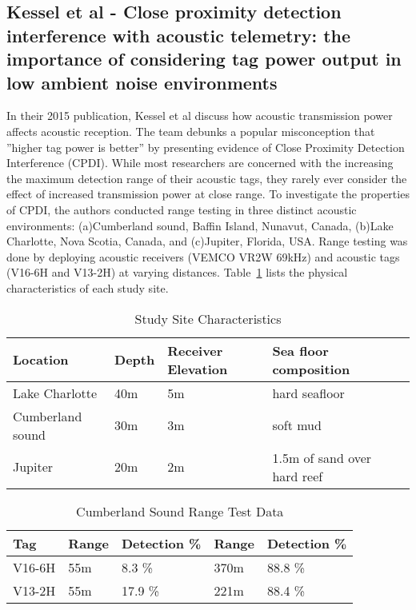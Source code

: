 \subsection{Kessel et al - Close proximity detection interference with acoustic telemetry: the importance of considering tag power output in low ambient noise environments}
In their 2015 publication, Kessel et al\cite{Kessel2015} discuss how acoustic transmission power affects acoustic reception.  The team debunks a popular misconception that ''higher tag power is better'' by presenting evidence of Close Proximity Detection Interference (CPDI).  While most researchers are concerned with the increasing the maximum detection range of their acoustic tags, they rarely ever consider the effect of increased transmission power at close range.  To investigate the properties of CPDI, the authors conducted range testing in three distinct acoustic environments: (a)Cumberland sound, Baffin Island, Nunavut, Canada, (b)Lake Charlotte, Nova Scotia, Canada, and (c)Jupiter, Florida, USA.  Range testing was done by deploying acoustic receivers (VEMCO VR2W 69kHz) and acoustic tags (V16-6H and V13-2H) at varying distances.  Table~\ref{CPDItable} lists the physical characteristics of each study site.

\begin{table}[ht]
	\begin{tabular}{l l l l l}
		Location&Depth&Receiver Elevation&Sea floor composition\\
		\hline
		Lake Charlotte			& 40m	& 5m	& hard seafloor \\
		Cumberland sound		& 30m	& 3m	& soft mud	\\
		Jupiter		& 20m	& 2m	& 1.5m of sand over hard reef\\
	\end{tabular}
	\caption{Study Site Characteristics
		\label{CPDItable}}
\end{table}

\begin{table}[ht]
	\begin{tabular}{l l l l l}
		Tag	&Range	&Detection \%	&Range	&Detection \%\\
		\hline
		V16-6H	&55m	& 8.3 \%		&370m	&88.8 \%\\
		V13-2H	&55m 	& 17.9 \%	&221m	&88.4 \%\\
	\end{tabular}
	\caption{Cumberland Sound Range Test Data
		\label{rangeTestData}}
\end{table}

